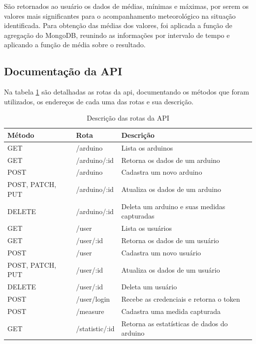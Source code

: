 São retornados ao usuário os dados de médias, mínimas e máximas, por serem os valores mais significantes para o acompanhamento meteorológico na situação identificada.
Para obtenção das médias dos valores, foi aplicada a função de agregação do MongoDB, reunindo as informações por intervalo de tempo e aplicando a função de média sobre o resultado.

\subsection{Documentação da API}
\label{sec:doc_api}

Na tabela \ref{table:table_api_routes} são detalhadas as rotas da api, documentando os métodos que foram utilizados, os endereços de cada uma das rotas e sua descrição.

\begin{table}[H]
    \centering
    \caption{Descrição das rotas da API}
    \label{table:table_api_routes}
    \begin{tabularx}{\textwidth}{l|l|l}
    \hline
    \textbf{Método}  & \textbf{Rota}        & \textbf{Descrição}                           \\ \hline
    GET              & /arduino             & Lista os arduinos                            \\ \hline
    GET              & /arduino/:id         & Retorna os dados de um arduino               \\ \hline
    POST             & /arduino             & Cadastra um novo arduino                     \\ \hline
    POST, PATCH, PUT & /arduino/:id         & Atualiza os dados de um arduino              \\ \hline
    DELETE           & /arduino/:id         & Deleta um arduino e suas medidas capturadas  \\ \hline
    GET              & /user                & Lista os usuários                            \\ \hline
    GET              & /user/:id            & Retorna os dados de um usuário               \\ \hline
    POST             & /user                & Cadastra um novo usuário                     \\ \hline
    POST, PATCH, PUT & /user/:id            & Atualiza os dados de um usuário              \\ \hline
    DELETE           & /user/:id            & Deleta um usuário                            \\ \hline
    POST             & /user/login          & Recebe as credenciais e retorna o token      \\ \hline
    POST             & /measure             & Cadastra uma medida capturada                \\ \hline
    GET              & /statistic/:id       & Retorna as estatísticas de dados do arduino  \\ \hline
    \end{tabularx}
\end{table}

